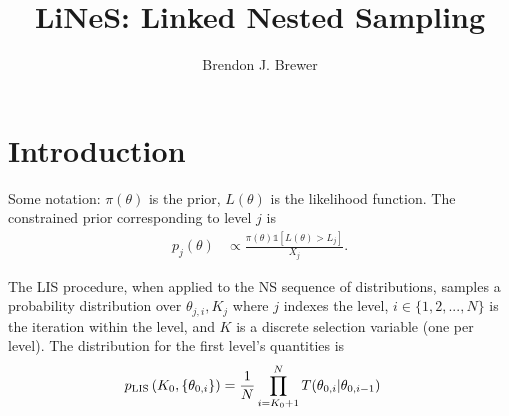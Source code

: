\documentclass[a4paper, 12pt]{article}
\title{LiNeS: Linked Nested Sampling}
\author{Brendon J. Brewer}
\date{}
\begin{document}
\maketitle


\setlength{\parindent}{0pt}
\setlength{\parskip}{8pt}

\section{Introduction}
Some notation: $\pi(\theta)$ is the prior, $L(\theta)$ is the
likelihood function. The constrained prior corresponding
to level $j$ is
\begin{align}
p_j(\theta) &\propto
\frac{\pi(\theta)\mathds{1}\left[L(\theta) > L_j\right]}
{X_j}.
\end{align}

The LIS procedure, when applied to the NS sequence of
distributions, samples a probability distribution over
$\theta_{j,i}, K_j$ where $j$ indexes the level,
$i \in \{1, 2, ..., N\}$ is the
iteration within the level, and $K$ is a discrete
selection variable (one per level). The distribution for the
first level's quantities is
\begin{align}
p_{\rm LIS}\left(K_0, \left\{\theta_{0,i}\right\}\right)
&= \frac{1}{N} \prod_{i=K_0+1}^N T(\theta_{0,i} | \theta_{0,i-1})
\end{align}

\begin{thebibliography}{999}
\end{thebibliography}
\end{document}
